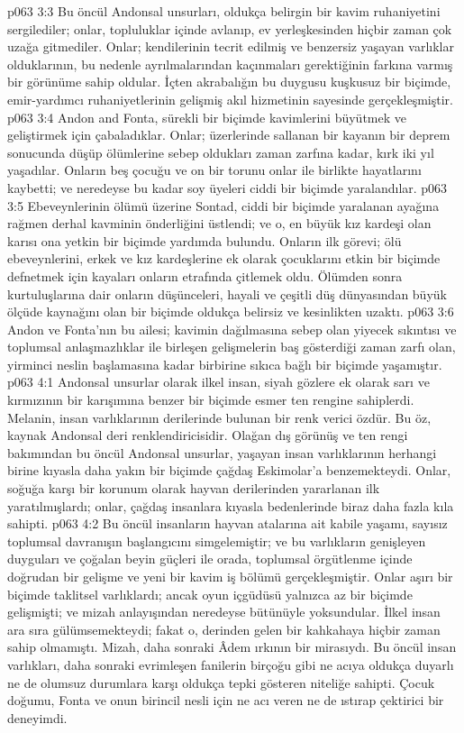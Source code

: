 \vs p063 3:3 Bu öncül Andonsal unsurları, oldukça belirgin bir kavim ruhaniyetini sergilediler; onlar, topluluklar içinde avlanıp, ev yerleşkesinden hiçbir zaman çok uzağa gitmediler. Onlar; kendilerinin tecrit edilmiş ve benzersiz yaşayan varlıklar olduklarının, bu nedenle ayrılmalarından kaçınmaları gerektiğinin farkına varmış bir görünüme sahip oldular. İçten akrabalığın bu duygusu kuşkusuz bir biçimde, emir\hyp{}yardımcı ruhaniyetlerinin gelişmiş akıl hizmetinin sayesinde gerçekleşmiştir.
\vs p063 3:4 Andon and Fonta, sürekli bir biçimde kavimlerini büyütmek ve geliştirmek için çabaladıklar. Onlar; üzerlerinde sallanan bir kayanın bir deprem sonucunda düşüp ölümlerine sebep oldukları zaman zarfına kadar, kırk iki yıl yaşadılar. Onların beş çocuğu ve on bir torunu onlar ile birlikte hayatlarını kaybetti; ve neredeyse bu kadar soy üyeleri ciddi bir biçimde yaralandılar.
\vs p063 3:5 Ebeveynlerinin ölümü üzerine Sontad, ciddi bir biçimde yaralanan ayağına rağmen derhal kavminin önderliğini üstlendi; ve o, en büyük kız kardeşi olan karısı ona yetkin bir biçimde yardımda bulundu. Onların ilk görevi; ölü ebeveynlerini, erkek ve kız kardeşlerine ek olarak çocuklarını etkin bir biçimde defnetmek için kayaları onların etrafında çitlemek oldu. Ölümden sonra kurtuluşlarına dair onların düşünceleri, hayali ve çeşitli düş dünyasından büyük ölçüde kaynağını olan bir biçimde oldukça belirsiz ve kesinlikten uzaktı.
\vs p063 3:6 Andon ve Fonta’nın bu ailesi; kavimin dağılmasına sebep olan yiyecek sıkıntısı ve toplumsal anlaşmazlıklar ile birleşen gelişmelerin baş gösterdiği zaman zarfı olan, yirminci neslin başlamasına kadar birbirine sıkıca bağlı bir biçimde yaşamıştır.
\vs p063 4:1 Andonsal unsurlar olarak ilkel insan, siyah gözlere ek olarak sarı ve kırmızının bir karışımına benzer bir biçimde esmer ten rengine sahiplerdi. Melanin, insan varlıklarının derilerinde bulunan bir renk verici özdür. Bu öz, kaynak Andonsal deri renklendiricisidir. Olağan dış görünüş ve ten rengi bakımından bu öncül Andonsal unsurlar, yaşayan insan varlıklarının herhangi birine kıyasla daha yakın bir biçimde çağdaş Eskimolar’a benzemekteydi. Onlar, soğuğa karşı bir korunum olarak hayvan derilerinden yararlanan ilk yaratılmışlardı; onlar, çağdaş insanlara kıyasla bedenlerinde biraz daha fazla kıla sahipti.
\vs p063 4:2 Bu öncül insanların hayvan atalarına ait kabile yaşamı, sayısız toplumsal davranışın başlangıcını simgelemiştir; ve bu varlıkların genişleyen duyguları ve çoğalan beyin güçleri ile orada, toplumsal örgütlenme içinde doğrudan bir gelişme ve yeni bir kavim iş bölümü gerçekleşmiştir. Onlar aşırı bir biçimde taklitsel varlıklardı; ancak oyun içgüdüsü yalnızca az bir biçimde gelişmişti; ve mizah anlayışından neredeyse bütünüyle yoksundular. İlkel insan ara sıra gülümsemekteydi; fakat o, derinden gelen bir kahkahaya hiçbir zaman sahip olmamıştı. Mizah, daha sonraki Âdem ırkının bir mirasıydı. Bu öncül insan varlıkları, daha sonraki evrimleşen fanilerin birçoğu gibi ne acıya oldukça duyarlı ne de olumsuz durumlara karşı oldukça tepki gösteren niteliğe sahipti. Çocuk doğumu, Fonta ve onun birincil nesli için ne acı veren ne de ıstırap çektirici bir deneyimdi.
